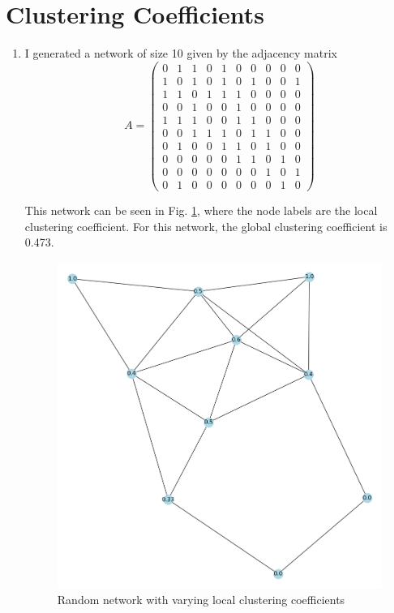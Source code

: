 \documentclass[a4paper]{article}
\begin{document}
\pagebreak

\section{Clustering Coefficients}

\begin{enumerate}[label={(4. \alph*)}]    
     \item 
         I generated a network of size 10 given by the adjacency matrix
\begin{equation*}
    A = 
    \begin{pmatrix} 
        0 & 1 & 1 & 0 & 1 & 0 & 0 & 0 & 0 & 0\\
        1 & 0 & 1 & 0 & 1 & 0 & 1 & 0 & 0 & 1\\
        1 & 1 & 0 & 1 & 1 & 1 & 0 & 0 & 0 & 0\\
        0 & 0 & 1 & 0 & 0 & 1 & 0 & 0 & 0 & 0\\
        1 & 1 & 1 & 0 & 0 & 1 & 1 & 0 & 0 & 0\\
        0 & 0 & 1 & 1 & 1 & 0 & 1 & 1 & 0 & 0\\
        0 & 1 & 0 & 0 & 1 & 1 & 0 & 1 & 0 & 0\\
        0 & 0 & 0 & 0 & 0 & 1 & 1 & 0 & 1 & 0\\
        0 & 0 & 0 & 0 & 0 & 0 & 0 & 1 & 0 & 1\\
        0 & 1 & 0 & 0 & 0 & 0 & 0 & 0 & 1 & 0
    \end{pmatrix} 
\end{equation*}
    


    This network can be seen in Fig. \ref{fig:small_clustering}, where the node labels are the local clustering coefficient. For this network, the global clustering coefficient is 0.473. 


    \begin{figure}[h]
        \centerline{\includegraphics[width=0.5\linewidth]{./small_clustering.png}}
        \caption{Random network with varying local clustering coefficients}
        \label{fig:small_clustering}
    \end{figure}

\end{enumerate}
\end{document}
